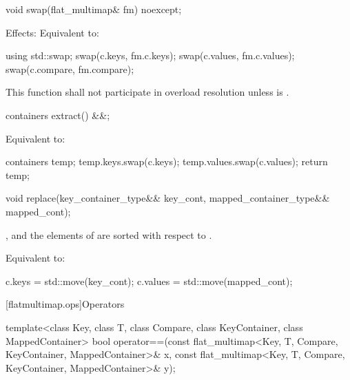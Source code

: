 \begin{codeblock}
\begin{codeblock}
\begin{codeblock}
\begin{addedblock}
%
\begin{itemdecl}
void swap(flat_multimap& fm) noexcept;
\end{itemdecl}

\begin{itemdescr}
\pnum Effects: Equivalent to:
\begin{codeblock}
using std::swap;
swap(c.keys, fm.c.keys);
swap(c.values, fm.c.values);
swap(c.compare, fm.compare);
\end{codeblock}

\pnum
\remarks
This function shall not participate in overload resolution
unless  is
.
\end{itemdescr}

%
\begin{itemdecl}
containers extract() &&;
\end{itemdecl}

\begin{itemdescr}
\effects Equivalent to:
\begin{codeblock}
containers temp;
temp.keys.swap(c.keys);
temp.values.swap(c.values);
return temp;
\end{codeblock}
\end{itemdescr}

%
\begin{itemdecl}
void replace(key_container_type&& key_cont, mapped_container_type&& mapped_cont);
\end{itemdecl}

\begin{itemdescr}
\pnum \expects
{}, and the elements of
 are sorted with respect to .

\pnum
\effects Equivalent to:
\begin{codeblock}
c.keys = std::move(key_cont);
c.values = std::move(mapped_cont);
\end{codeblock}
\end{itemdescr}

[flatmultimap.ops]{Operators}

%
\begin{itemdecl}
template<class Key, class T, class Compare, class KeyContainer, class MappedContainer>
  bool operator==(const flat_multimap<Key, T, Compare, KeyContainer, MappedContainer>& x,
                  const flat_multimap<Key, T, Compare, KeyContainer, MappedContainer>& y);
\end{itemdecl}


\end{addedblock}
\end{codeblock}
\end{codeblock}
\end{codeblock}
